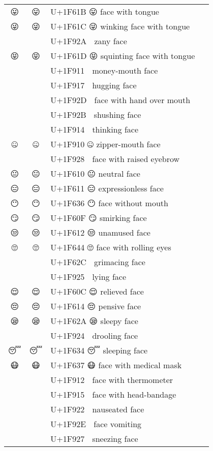 \documentclass[a4paper,12pt]{ltjarticle}
\newcommand{\fontA}[1]{{\fontspec[RawFeature={mode=harf,+dist,+ccmp}]{Segoe UI Emoji} #1}}
\newcommand{\fontB}[1]{{\fontspec[RawFeature={mode=harf,+dist,+ccmp}]{Noto Color Emoji} #1}}
\begin{document}
\begin{longtable}[c]{ccp{0.8\linewidth}}
\fontA{😛}&\fontB{😛}&U+1F61B 😛 face with tongue\\
\fontA{😜}&\fontB{😜}&U+1F61C 😜 winking face with tongue\\
\fontA{🤪}&\fontB{🤪}&U+1F92A 🤪 zany face\\
\fontA{😝}&\fontB{😝}&U+1F61D 😝 squinting face with tongue\\
\fontA{🤑}&\fontB{🤑}&U+1F911 🤑 money-mouth face\\
\fontA{🤗}&\fontB{🤗}&U+1F917 🤗 hugging face\\
\fontA{🤭}&\fontB{🤭}&U+1F92D 🤭 face with hand over mouth\\
\fontA{🤫}&\fontB{🤫}&U+1F92B 🤫 shushing face\\
\fontA{🤔}&\fontB{🤔}&U+1F914 🤔 thinking face\\
\fontA{🤐}&\fontB{🤐}&U+1F910 🤐 zipper-mouth face\\
\fontA{🤨}&\fontB{🤨}&U+1F928 🤨 face with raised eyebrow\\
\fontA{😐}&\fontB{😐}&U+1F610 😐 neutral face\\
\fontA{😑}&\fontB{😑}&U+1F611 😑 expressionless face\\
\fontA{😶}&\fontB{😶}&U+1F636 😶 face without mouth\\
\fontA{😏}&\fontB{😏}&U+1F60F 😏 smirking face\\
\fontA{😒}&\fontB{😒}&U+1F612 😒 unamused face\\
\fontA{🙄}&\fontB{🙄}&U+1F644 🙄 face with rolling eyes\\
\fontA{😬}&\fontB{😬}&U+1F62C 😬 grimacing face\\
\fontA{🤥}&\fontB{🤥}&U+1F925 🤥 lying face\\
\fontA{😌}&\fontB{😌}&U+1F60C 😌 relieved face\\
\fontA{😔}&\fontB{😔}&U+1F614 😔 pensive face\\
\fontA{😪}&\fontB{😪}&U+1F62A 😪 sleepy face\\
\fontA{🤤}&\fontB{🤤}&U+1F924 🤤 drooling face\\
\fontA{😴}&\fontB{😴}&U+1F634 😴 sleeping face\\
\fontA{😷}&\fontB{😷}&U+1F637 😷 face with medical mask\\
\fontA{🤒}&\fontB{🤒}&U+1F912 🤒 face with thermometer\\
\fontA{🤕}&\fontB{🤕}&U+1F915 🤕 face with head-bandage\\
\fontA{🤢}&\fontB{🤢}&U+1F922 🤢 nauseated face\\
\fontA{🤮}&\fontB{🤮}&U+1F92E 🤮 face vomiting\\
\fontA{🤧}&\fontB{🤧}&U+1F927 🤧 sneezing face\\

\end{longtable}
\end{document}

